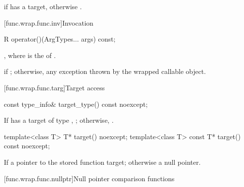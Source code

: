 \begin{itemdescr}
\pnum
\returns
{} if  has a target, otherwise .
\end{itemdescr}

[func.wrap.func.inv]{Invocation}

\begin{indexed}{}
\begin{itemdecl}
R operator()(ArgTypes... args) const;
\end{itemdecl}
\end{indexed}

\begin{itemdescr}
\pnum
\returns
{},
where  is the  of .

\pnum
\throws
{} if ; otherwise, any
exception thrown by the wrapped callable object.
\end{itemdescr}

[func.wrap.func.targ]{Target access}

\begin{indexed}{}
\begin{itemdecl}
const type_info& target_type() const noexcept;
\end{itemdecl}
\end{indexed}

\begin{itemdescr}
\pnum
\returns
If  has a target of type ,
  ; otherwise, .
\end{itemdescr}

\begin{indexed}{}
\begin{itemdecl}
template<class T>       T* target() noexcept;
template<class T> const T* target() const noexcept;
\end{itemdecl}
\end{indexed}

\begin{itemdescr}
\pnum
\returns
If 
a pointer to the stored function target; otherwise a null pointer.
\end{itemdescr}

[func.wrap.func.nullptr]{Null pointer comparison functions}

